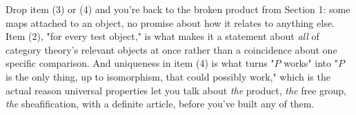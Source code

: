 Drop item (3) or (4) and you're back to the broken product from Section 1: some maps attached to an object, no promise about how it relates to anything else. Item (2), "for every test object," is what makes it a statement about \emph{all} of category theory's relevant objects at once rather than a coincidence about one specific comparison. And uniqueness in item (4) is what turns "$P$ works" into "$P$ is the only thing, up to isomorphism, that could possibly work," which is the actual reason universal properties let you talk about \emph{the} product, \emph{the} free group, \emph{the} sheafification, with a definite article, before you've built any of them.
